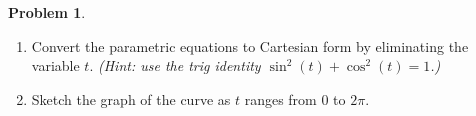 \documentclass[10pt]{article}
\theoremstyle{definition}
\newtheorem{problem}[theorem]{Problem}
\newcommand{\1}[1]{\textbf{1}_{\left[#1\right]}} %
\begin{document}
\begin{problem}
\begin{enumerate}[(a.)]
    \item Convert the parametric equations to Cartesian form by eliminating the variable $t$.
    \textit{(Hint: use the trig identity $\sin^{2}(t)+\cos^{2}(t) =1$.)}
    \item Sketch the graph of the curve as $t$ ranges from $0$ to $2\pi$.
  \end{enumerate}
\end{problem}
\end{document}

